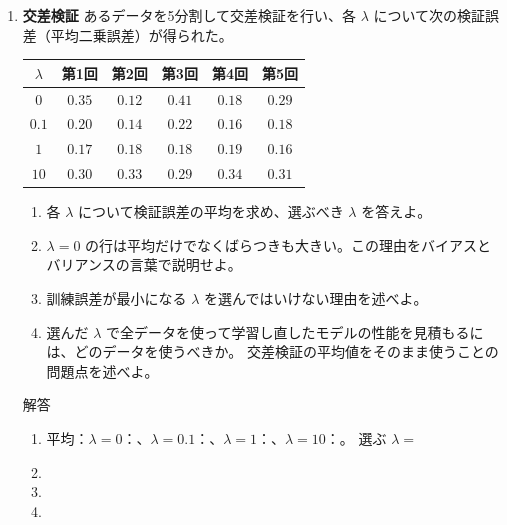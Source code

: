 \documentclass[a4paper,dvipdfmx]{jsarticle}
\newcommand{\提出期限}{2026年11月2日（月）}
\newcommand{\学籍番号}{0000000}
\newcommand{\氏名}{氏名を書く}
\newcommand{\提出日}{2026年11月2日}
\newenvironment{answer}{\begin{itembox}[l]{解答}}{\end{itembox}}
\begin{document}
\begin{enumerate}
  \item \textbf{交差検証}\quad
    あるデータを5分割して交差検証を行い、各 $\lambda$ について次の検証誤差（平均二乗誤差）が得られた。
    \begin{center}
      \begin{tabular}{c|ccccc}
        \hline
        $\lambda$ & 第1回 & 第2回 & 第3回 & 第4回 & 第5回 \\
        \hline\hline
        $0$ & $0.35$ & $0.12$ & $0.41$ & $0.18$ & $0.29$ \\
        $0.1$ & $0.20$ & $0.14$ & $0.22$ & $0.16$ & $0.18$ \\
        $1$ & $0.17$ & $0.18$ & $0.18$ & $0.19$ & $0.16$ \\
        $10$ & $0.30$ & $0.33$ & $0.29$ & $0.34$ & $0.31$ \\
        \hline
      \end{tabular}
    \end{center}
    \begin{enumerate}
      \item 各 $\lambda$ について検証誤差の平均を求め、選ぶべき $\lambda$ を答えよ。
      \item $\lambda = 0$ の行は平均だけでなくばらつきも大きい。この理由をバイアスとバリアンスの言葉で説明せよ。
      \item 訓練誤差が最小になる $\lambda$ を選んではいけない理由を述べよ。
      \item 選んだ $\lambda$ で全データを使って学習し直したモデルの性能を見積もるには、どのデータを使うべきか。
        交差検証の平均値をそのまま使うことの問題点を述べよ。
    \end{enumerate}
    \begin{answer}
      \begin{enumerate}
        \item 平均：$\lambda = 0$：\phantom{XXXX}、$\lambda = 0.1$：\phantom{XXXX}、$\lambda = 1$：\phantom{XXXX}、$\lambda = 10$：\phantom{XXXX}。
          選ぶ $\lambda = $ \phantom{XXXX}
          \vspace{2mm}
        \item
          \vspace{12mm}
        \item
          \vspace{10mm}
        \item
          \vspace{12mm}
      \end{enumerate}
    \end{answer}

\end{enumerate}
\end{document}
